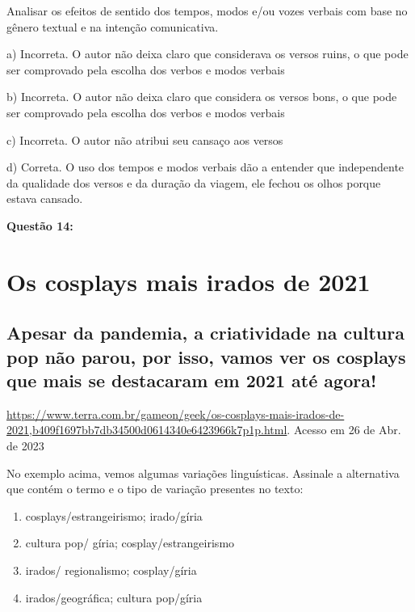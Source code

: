 Analisar os efeitos de sentido dos tempos, modos e/ou vozes verbais com
base no gênero textual e na intenção comunicativa.

a) Incorreta. O autor não deixa claro que considerava os versos ruins, o
que pode ser comprovado pela escolha dos verbos e modos verbais

b) Incorreta. O autor não deixa claro que considera os versos bons, o
que pode ser comprovado pela escolha dos verbos e modos verbais

c) Incorreta. O autor não atribui seu cansaço aos versos

d) Correta. O uso dos tempos e modos verbais dão a entender que
independente da qualidade dos versos e da duração da viagem, ele fechou
os olhos porque estava cansado.

\textbf{Questão 14:}

\hypertarget{os-cosplays-mais-irados-de-2021}{%
\section{\texorpdfstring{\textbf{Os cosplays mais irados de
2021}}{Os cosplays mais irados de 2021}}\label{os-cosplays-mais-irados-de-2021}}

\hypertarget{apesar-da-pandemia-a-criatividade-na-cultura-pop-nuxe3o-parou-por-isso-vamos-ver-os-cosplays-que-mais-se-destacaram-em-2021-atuxe9-agora}{%
\subsection{Apesar da pandemia, a criatividade na cultura pop não parou,
por isso, vamos ver os cosplays que mais se destacaram em 2021 até
agora!}\label{apesar-da-pandemia-a-criatividade-na-cultura-pop-nuxe3o-parou-por-isso-vamos-ver-os-cosplays-que-mais-se-destacaram-em-2021-atuxe9-agora}}

\href{https://www.terra.com.br/gameon/geek/os-cosplays-mais-irados-de-2021,b409f1697bb7db34500d0614340e6423966k7p1p.html}{{https://www.terra.com.br/gameon/geek/os-cosplays-mais-irados-de-2021,b409f1697bb7db34500d0614340e6423966k7p1p.html}}.
Acesso em 26 de Abr. de 2023

No exemplo acima, vemos algumas variações linguísticas. Assinale a
alternativa que contém o termo e o tipo de variação presentes no texto:

\begin{enumerate}
\def\labelenumi{\alph{enumi})}
\item
  cosplays/estrangeirismo; irado/gíria
\item
  cultura pop/ gíria; cosplay/estrangeirismo
\item
  irados/ regionalismo; cosplay/gíria
\item
  irados/geográfica; cultura pop/gíria
\end{enumerate}

